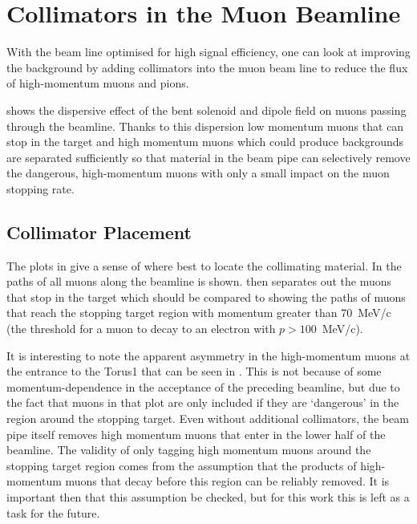 \section{Collimators in the Muon Beamline}
\FigOptimMuBeamDipoleMuDispersion
With the beam line optimised for high signal efficiency, one can look at improving the background by adding collimators into the muon beam line to reduce the flux of high-momentum muons and pions.

 shows the dispersive effect of the bent solenoid and dipole field on muons passing through the beamline.
Thanks to this dispersion low momentum muons that can stop in the target and high momentum muons which could produce backgrounds are separated sufficiently so that material in the beam pipe can selectively remove the dangerous, high-momentum muons with only a small impact on the muon stopping rate.

\subsection{Collimator Placement}
\FigOptimMuBeamCollimMuonPaths
The plots in  give a sense of where best to locate the collimating material.
In  the paths of all muons along the beamline is shown.
 then separates out the muons that stop in the target which should be compared to 
 showing the paths of muons that reach the stopping target region with momentum greater than 70~MeV/c (the threshold for a muon to decay to an electron with $p>100$~MeV/c).

It is interesting to note the apparent asymmetry in the high-momentum muons at the entrance to the Torus1 that can be seen in .  
This is not because of some momentum-dependence in the acceptance of the preceding beamline, but due to the fact that muons in that plot are only included if they are `dangerous' in the region around the stopping target.
Even without additional collimators, the beam pipe itself removes high momentum muons that enter in the lower half of the beamline.
The validity of only tagging high momentum muons around the stopping target region comes from the assumption that the products of high-momentum muons that decay before this region can be reliably removed.
It is important then that this assumption be checked, but for this work this is left as a task for the future.

